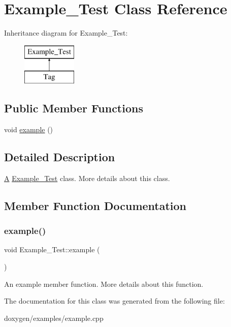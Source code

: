\hypertarget{class_example___test}{}\section{Example\+\_\+\+Test Class Reference}
\label{class_example___test}
Inheritance diagram for Example\+\_\+\+Test\+:\begin{figure}[H]
\begin{center}
\leavevmode
\includegraphics[height=2.000000cm]{class_example___test}
\end{center}
\end{figure}
\subsection*{Public Member Functions}
\begin{DoxyCompactItemize}
\item 
void \mbox{\hyperlink{class_example___test_a22a62b12c65fd5e43b6eadaabb21ebb0}{example}} ()
\end{DoxyCompactItemize}


\subsection{Detailed Description}
\mbox{\hyperlink{class_a}{A}} \mbox{\hyperlink{class_example___test}{Example\+\_\+\+Test}} class. More details about this class. 

\subsection{Member Function Documentation}
\mbox{\label{class_example___test_a22a62b12c65fd5e43b6eadaabb21ebb0}} 
\subsubsection{\texorpdfstring{example()}{example()}}
{\footnotesize\ttfamily void Example\+\_\+\+Test\+::example (\begin{DoxyParamCaption}{ }\end{DoxyParamCaption})}

An example member function. More details about this function. 

The documentation for this class was generated from the following file\+:\begin{DoxyCompactItemize}
\item 
doxygen/examples/example.\+cpp\end{DoxyCompactItemize}
